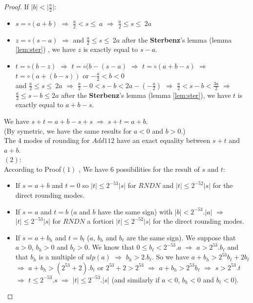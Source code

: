 \begin{proof}
If $\lvert b \rvert < \lvert \frac{a}{2} \rvert$:
\begin{itemize}
    \item $s = \circ (a+b)$ $\Rightarrow$ $\frac{a}{2} < s \le \ a$ $\Rightarrow$ $\frac{a}{2} \le s \le \ 2a$
    \item $z = \circ (s-a)$ $\Rightarrow$ and  $\frac{a}{2} \le s \le \ 2a$ after the \textbf{Sterbenz}'s lemma (lemma \ref{lem:ster}) , we have $z$ is exactly equal to $s-a$.
    \item $t = \circ (b-z)$ $\Rightarrow$ $t = \circ (b - (s-a)$ $\Rightarrow$ $t = \circ(a+b -s)$  $\Rightarrow$ $t = \circ(a+(b-s))$ or $-\frac{a}{2} < b < 0$\\
    and $\frac{a}{2} \le s \le \ 2a$  $\Rightarrow$ $\frac{a}{2} -0 < s - b < 2a - (-\frac{a}{2})$ $\Rightarrow$ $\frac{a}{2}< s - b < \frac{3a}{2}$ $\Rightarrow$ $\frac{a}{2} \le s - b \le 2a$ after the \textbf{Sterbenz}'s lemma (lemma \ref{lem:ster}), we have $t$ is exactly equal to $a+b-s$.\\
\end{itemize}
We have $s+t = a+b-s+s$ $\Rightarrow$ $s+t = a+b$.\\
(By symetric, we have the same results for $a<0$ and $b>0$.)\\
The $4$ modes of rounding for $Add112$ have an exact equality between $s+t$ and $a+b$.\\

$(2)$:\\
According to Proof$(1)$ , We have $6$ possibilities for the result of $s$ and $t$:\\
\begin{itemize}

\item If $s = a+b$ and $t = 0$ so   $ \lvert t \rvert \le 2^{-53} \lvert s \rvert$ for  $RNDN$ and  $ \lvert t \rvert \le 2^{-52} \lvert s \rvert$ for the direct rounding modes.\\

\item If $s = a$ and $t =b$ ($a$ and $b$ have the same sign) with  $\lvert b \rvert < 2^{-53}.\lvert a \rvert$
$\Rightarrow$ $ \lvert t \rvert \le 2^{-53} \lvert s \rvert$ for $RNDN$ a fortiori  $ \lvert t \rvert \le 2^{-52} \lvert s \rvert$ for the direct rounding modes.\\

\item If $s=a+b_h$ and $t = b_l$ ($a$, $b_h$ and $b_{\ell}$ are the same sign). 
We suppose that $a >0$, $b_h > 0$ and $b_{\ell} > 0$.
We know that $0 \le  b_{\ell}   < 2^{-53}.  a $ 
$\Rightarrow$ $  a  >  2^{53}.  b_{\ell} $ and that $b_h$ is a multiple of 
$ulp(a)$ $\Rightarrow$ $  b_h  > 2.  b_{\ell} $. So we have $a + b_h > 2^{53}b_{\ell} + 2b_{\ell}$ $\Rightarrow$ $a + b_h > (2^{53} + 2).b_{\ell}$
or $2^{53} +2 > 2^{53}$ $\Rightarrow$ $a + b_h > 2^{53}b_{\ell}$ 
$\Rightarrow$ $s > 2^{53}.t $ $\Rightarrow$ $t \le 2^{-53}.s$ $\Rightarrow$ $ \lvert t \rvert \le 2^{-53} .\lvert s \rvert$ (and similarly if $a <0$, $b_h <0$ and $b_{\ell} < 0$).\\


\end{itemize}
\end{proof}
